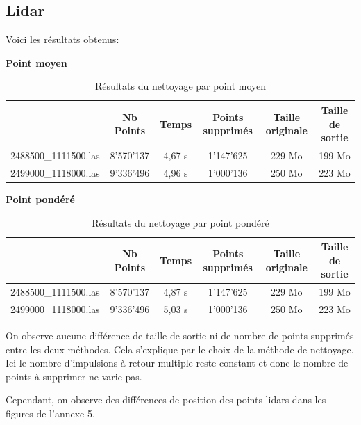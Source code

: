 \subsection{Lidar}
Voici les résultats obtenus:

\textbf{Point moyen}

\begin{table}[htb!]
\begin{tabular}{l|c|c|c|c|c|}
\cline{2-6}
\multicolumn{1}{c|}{}                      & Nb Points & Temps  & Points supprimés & Taille originale & Taille de sortie \\ \hline
\multicolumn{1}{|l|}{2488500\_1111500.las} & 8'570'137 & 4,67 s & 1'147'625        & 229 Mo          & 199 Mo           \\ \hline
\multicolumn{1}{|l|}{2499000\_1118000.las} & 9'336'496 & 4,96 s & 1'000'136        & 250 Mo          & 223 Mo           \\ \hline
\end{tabular}
\caption{Résultats du nettoyage par point moyen}
\label{tab:las_cleaning_avg}
\end{table}

\textbf{Point pondéré}

\begin{table}[htb!]
\begin{tabular}{l|c|c|c|c|c|}
\cline{2-6}
\multicolumn{1}{c|}{}                      & Nb Points & Temps  & Points supprimés & Taille originale & Taille de sortie \\ \hline
\multicolumn{1}{|l|}{2488500\_1111500.las} & 8'570'137 & 4,87 s & 1'147'625        & 229 Mo          & 199 Mo           \\ \hline
\multicolumn{1}{|l|}{2499000\_1118000.las} & 9'336'496 & 5,03 s & 1'000'136        & 250 Mo          & 223 Mo           \\ \hline
\end{tabular}
\caption{Résultats du nettoyage par point pondéré}
\label{tab:las_cleaning_ponderated}
\end{table}

On observe aucune différence de taille de sortie ni de nombre de points supprimés entre les deux méthodes.
Cela s'explique par le choix de la méthode de nettoyage.
Ici le nombre d'impulsions à retour multiple reste constant et donc le nombre de points à supprimer ne varie pas.

Cependant, on observe des différences de position des points lidars dans les figures de l'annexe 5.

